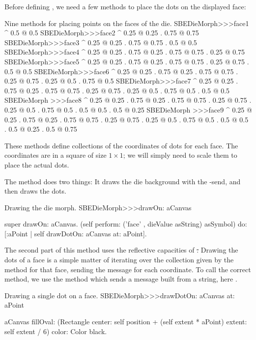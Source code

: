 \documentclass[a4paper,10pt,twoside]{book}
\begin{document}
Before defining , we need a few methods to place the dots on the displayed face:
\begin{methods}{Nine methods for placing points on the faces of the die.}
SBEDieMorph>>>face1
	^ {0.5 @ 0.5}
SBEDieMorph>>>face2
	^ {0.25 @ 0.25 . 0.75 @ 0.75}
SBEDieMorph>>>face3
	^ {0.25 @ 0.25 . 0.75 @ 0.75 . 0.5 @ 0.5}
SBEDieMorph>>>face4
	^ {0.25 @ 0.25 . 0.75 @ 0.25 . 0.75 @ 0.75 . 0.25 @ 0.75}
SBEDieMorph>>>face5
	^ {0.25 @ 0.25 . 0.75 @ 0.25 . 0.75 @ 0.75 . 0.25 @ 0.75 . 0.5 @ 0.5}
SBEDieMorph>>>face6
	^ {0.25 @ 0.25 . 0.75 @ 0.25 . 0.75 @ 0.75 . 0.25 @ 0.75 . 0.25 @ 0.5 . 0.75 @ 0.5}
SBEDieMorph>>>face7
	^ {0.25 @ 0.25 . 0.75 @ 0.25 . 0.75 @ 0.75 . 0.25 @ 0.75 . 0.25 @ 0.5 . 0.75 @ 0.5 . 0.5 @ 0.5}
SBEDieMorph >>>face8
	^ {0.25 @ 0.25 . 0.75 @ 0.25 . 0.75 @ 0.75 . 0.25 @ 0.75 . 0.25 @ 0.5 . 0.75 @ 0.5 . 0.5 @ 0.5 . 0.5 @ 0.25}
SBEDieMorph >>>face9
	^ {0.25 @ 0.25 . 0.75 @ 0.25 . 0.75 @ 0.75 . 0.25 @ 0.75 . 0.25 @ 0.5 . 0.75 @ 0.5 . 0.5 @ 0.5 . 0.5 @ 0.25 . 0.5 @ 0.75}
\end{methods}

These methods define collections of the coordinates of dots for each face.
The coordinates are in a square of size $1 \times 1$; we will simply need to scale them to place the actual dots.

The  method does two things:
It draws the die background with the -send, and then draws the dots.
\begin{method}{Drawing the die morph.}
SBEDieMorph>>>drawOn: aCanvas

	super drawOn: aCanvas.
	(self perform: ('face' , dieValue asString) asSymbol) do: [:aPoint |
		self drawDotOn: aCanvas at: aPoint].
\end{method}

The second part of this method uses the reflective capacities of \st.
Drawing the dots of a face is a simple matter of iterating over the collection given by the  method for that face, sending the  message for each coordinate.
To call the correct  method, we use the  method which sends a message built from a string, here .

\begin{method}{Drawing a single dot on a face.}
SBEDieMorph>>>drawDotOn: aCanvas at: aPoint

	aCanvas
		fillOval: (Rectangle
			center: self position + (self extent * aPoint)
			extent: self extent / 6)
		color: Color black.
\end{method}
\end{document}
